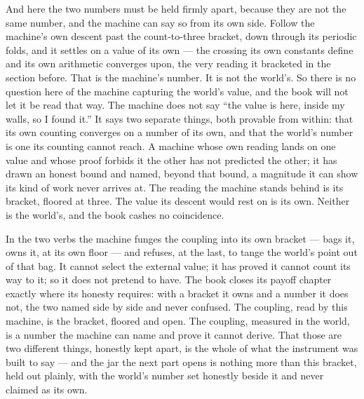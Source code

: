 And here the two numbers must be held firmly apart, because they are not the same number, and the machine can say so
from its own side. Follow the machine's own descent past the count-to-three bracket, down through its periodic folds,
and it settles on a value of its own --- the crossing its own constants define and its
own arithmetic converges upon, the very reading it bracketed in the section before. That is the machine's number. It is not the world's. So there is no question here of the
machine capturing the world's value, and the book will not let it be read that way. The machine does not say ``the value
is here, inside my walls, so I found it.'' It says two separate things, both provable from within: that its own counting
converges on a number of its own, and that the world's number is one its counting cannot reach. A machine whose own
reading lands on one value and whose proof forbids it the other has not predicted the other; it has drawn an honest
bound and named, beyond that bound, a magnitude it can show its kind of work never arrives at. The reading the machine
stands behind is its bracket, floored at three. The value its descent would rest on is its own. Neither is the world's,
and the book cashes no coincidence.

In the two verbs the machine funges the coupling into its own bracket --- bags it, owns it, at its own floor --- and
refuses, at the last, to tange the world's point out of that bag. It cannot select the external value; it has proved it
cannot count its way to it; so it does not pretend to have. The book closes its payoff chapter exactly where its
honesty requires: with a bracket it owns and a number it does not, the two named side by side and never confused. The
coupling, read by this machine, is the bracket, floored and open. The coupling, measured in the world, is a number the
machine can name and prove it cannot derive. That those are two different things, honestly kept apart, is the whole of
what the instrument was built to say --- and the jar the next part opens is nothing more than this bracket, held out
plainly, with the world's number set honestly beside it and never claimed as its own.
